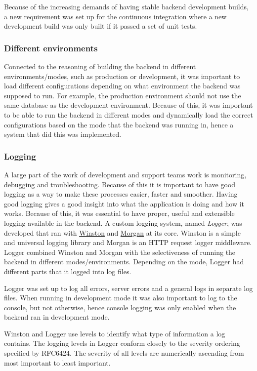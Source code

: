 Because of the increasing demands of having stable backend development builds, a new requirement was set up for the continuous integration where a new development build was only built if it passed a set of unit tests.

\subsubsection{Different environments}
Connected to the reasoning of building the backend in different environments/modes, such as production or development, it was important to load different configurations depending on what environment the backend was supposed to run. For example, the production environment should not use the same database as the development environment. Because of this, it was important to be able to run the backend in different modes and dynamically load the correct configurations based on the mode that the backend was running in, hence a system that did this was implemented.

\subsubsection{Logging} \label{logging}
A large part of the work of development and support teams work is monitoring, debugging and troubleshooting. Because of this it is important to have good logging as a way to make these processes easier, faster and smoother. Having good logging gives a good insight into what the application is doing and how it works. Because of this, it was essential to have proper, useful and extensible logging available in the backend. A custom logging system, named \emph{Logger}, was developed that ran with \href{https://github.com/winstonjs/winston}{Winston} and \href{https://github.com/expressjs/morgan}{Morgan} at its core. Winston is a simple and universal logging library and Morgan is an HTTP request logger middleware. Logger combined Winston and Morgan with the selectiveness of running the backend in different modes/environments. Depending on the mode, Logger had different parts that it logged into log files.

Logger was set up to log all errors, server errors and a general logs in separate log files. When running in development mode it was also important to log to the console, but not otherwise, hence console logging was only enabled when the backend ran in development mode.

Winston and Logger use levels to identify what type of information a log contains. The logging levels in Logger conform closely to the severity ordering specified by RFC6424.
The severity of all levels are numerically ascending from most important to least important.

